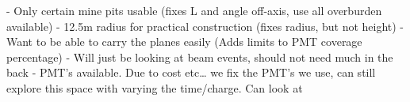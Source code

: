 - Only certain mine pits usable (fixes L and angle off-axis, use all overburden available)
- 12.5m radius for practical construction (fixes radius, but not height)
- Want to be able to carry the planes easily (Adds limits to PMT coverage percentage)
- Will just be looking at beam events, should not need much in the back
- PMT’s available. Due to cost etc… we fix the PMT’s we use, can still explore this space with
varying the time/charge. Can look at